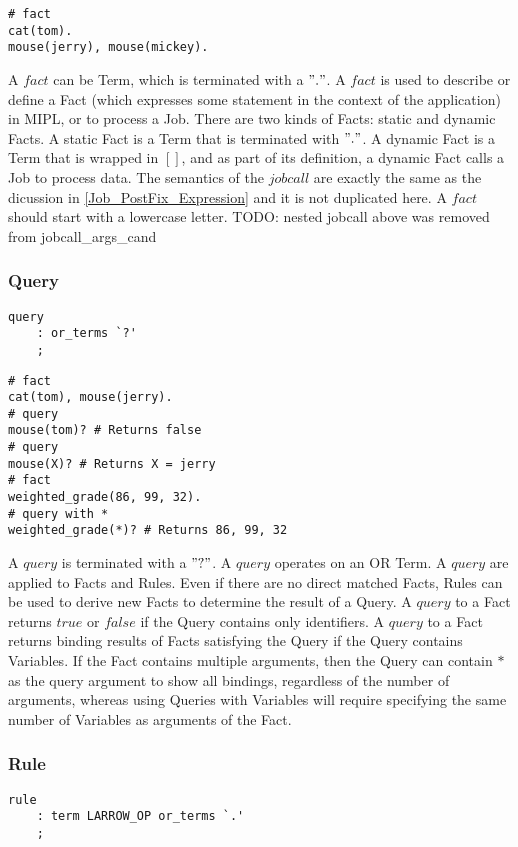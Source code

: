 \documentclass[prodmode,acmtecs]{acmsmall}
\begin{document}
\begin{lstlisting}
# fact
cat(tom).
mouse(jerry), mouse(mickey).
\end{lstlisting}

A $fact$ can be Term, which is terminated with a $"."$. A $fact$ is used to
describe or define a Fact (which expresses some statement in the context
of the application) in MIPL, or to process a Job. There are two kinds of
Facts: static and dynamic Facts. A static Fact is a Term that is terminated
with $"."$. A dynamic Fact is a Term that is wrapped in $[ ]$, and as part
of its definition, a dynamic Fact calls a Job to process data. The semantics
of the $jobcall$ are exactly the same as the dicussion in \ref{Job_PostFix_Expression}
and it is not duplicated here. A $fact$ should start with a lowercase letter.
TODO: nested jobcall above was removed from jobcall\_args\_cand
\medskip

\subsubsection{Query}
\begin{lstlisting}
query
	: or_terms `?'		
	;
\end{lstlisting}

\begin{lstlisting}
# fact
cat(tom), mouse(jerry).
# query
mouse(tom)? # Returns false
# query
mouse(X)? # Returns X = jerry
# fact
weighted_grade(86, 99, 32).
# query with *
weighted_grade(*)? # Returns 86, 99, 32
\end{lstlisting}

A $query$ is terminated with a $"?"$. A $query$ operates on an OR Term. A $query$ 
are applied to Facts and Rules. Even if there are no direct matched Facts, Rules
can be used to derive new Facts to determine the result of a Query. A $query$ to 
a Fact returns $true$ or $false$ if the Query contains only identifiers. A $query$ 
to a Fact returns binding results of Facts satisfying the Query if the Query contains 
Variables. If the Fact contains multiple  arguments, then the Query can contain $*$
as the query argument to show all bindings, regardless of the number of arguments, 
whereas using Queries with Variables will require specifying the same number of 
Variables as arguments of the Fact.
\medskip

\subsubsection{Rule}
\begin{lstlisting}
rule
	: term LARROW_OP or_terms `.'
	;
\end{lstlisting}
\end{document}
